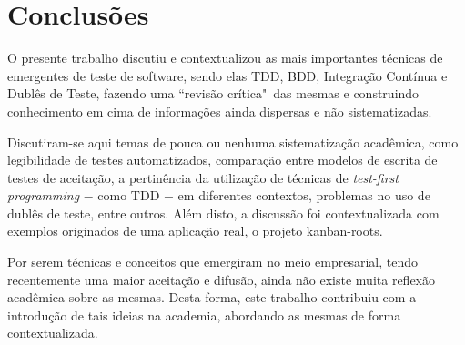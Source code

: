 \chapter{Conclusões}
\label{cha:conclusoes}

O presente trabalho discutiu e contextualizou as mais importantes técnicas de emergentes de teste de software, sendo elas TDD, BDD, Integração Contínua e Dublês de Teste, fazendo uma ``revisão crítica"\ das mesmas e construindo conhecimento em cima de informações ainda dispersas e não sistematizadas.

Discutiram-se aqui temas de pouca ou nenhuma sistematização acadêmica, como legibilidade de testes automatizados, comparação entre modelos de escrita de testes de aceitação, a pertinência da utilização de técnicas de \textit{test-first programming} $-$ como TDD $-$ em diferentes contextos, problemas no uso de dublês de teste, entre outros. Além disto, a discussão foi contextualizada com exemplos originados de uma aplicação real, o projeto kanban-roots.

Por serem técnicas e conceitos que emergiram no meio empresarial, tendo recentemente uma maior aceitação e difusão, ainda não existe muita reflexão acadêmica sobre as mesmas. Desta forma, este trabalho contribuiu com a introdução de tais ideias na academia, abordando as mesmas de forma contextualizada.